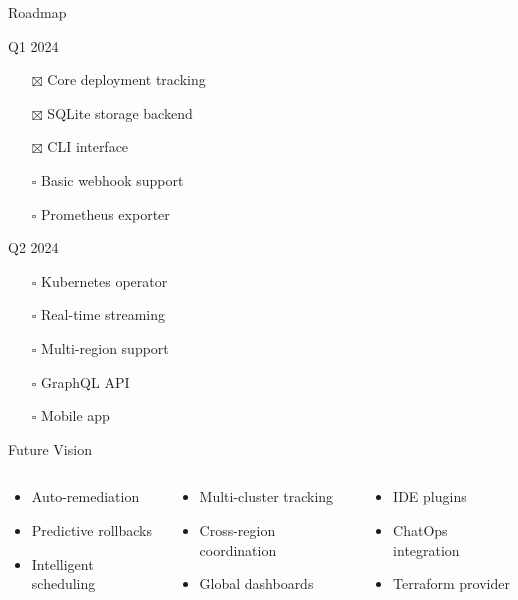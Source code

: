 \documentclass[presentation,aspectratio=169]{beamer}
\begin{document}
\begin{frame}[label={sec:org7d7a195}]{Roadmap}
\begin{block}{Q1 2024}
\begin{itemize}
\item[{$\boxtimes$}] Core deployment tracking
\item[{$\boxtimes$}] SQLite storage backend
\item[{$\boxtimes$}] CLI interface
\item[{$\square$}] Basic webhook support
\item[{$\square$}] Prometheus exporter
\end{itemize}
\end{block}
\begin{block}{Q2 2024}
\begin{itemize}
\item[{$\square$}] Kubernetes operator
\item[{$\square$}] Real-time streaming
\item[{$\square$}] Multi-region support
\item[{$\square$}] GraphQL API
\item[{$\square$}] Mobile app
\end{itemize}
\end{block}
\begin{block}{Future Vision}
\begin{columns}
\begin{column}{0.33\columnwidth}
\begin{itemize}
\item Auto-remediation
\item Predictive rollbacks
\item Intelligent scheduling
\end{itemize}
\end{column}
\begin{column}{0.33\columnwidth}
\begin{itemize}
\item Multi-cluster tracking
\item Cross-region coordination
\item Global dashboards
\end{itemize}
\end{column}
\begin{column}{0.34\columnwidth}
\begin{itemize}
\item IDE plugins
\item ChatOps integration
\item Terraform provider
\end{itemize}
\end{column}
\end{columns}
\end{block}
\end{frame}
\end{document}
